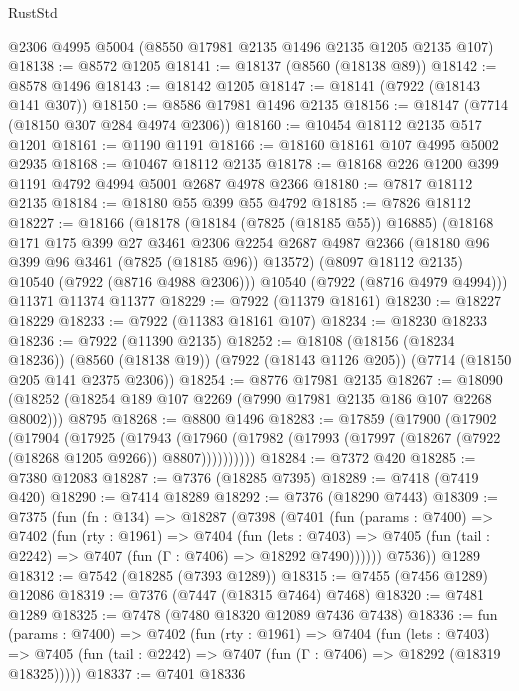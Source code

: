 \begin{lexlean}{RustStd}
\begin{coremodule}
    @2306
    @4995
    @5004
    (@8550 @17981 @2135 @1496 @2135 @1205 @2135 @107)
@18138 := @8572 @1205
@18141 := @18137 (@8560 (@18138 @89))
@18142 := @8578 @1496
@18143 := @18142 @1205
@18147 := @18141 (@7922 (@18143 @141 @307))
@18150 := @8586 @17981 @1496 @2135
@18156 := @18147 (@7714 (@18150 @307 @284 @4974 @2306))
@18160 := @10454 @18112 @2135 @517 @1201
@18161 := @1190 @1191
@18166 := @18160 @18161 @107 @4995 @5002 @2935
@18168 := @10467 @18112 @2135
@18178 := @18168 @226 @1200 @399 @1191 @4792 @4994 @5001 @2687 @4978 @2366
@18180 := @7817 @18112 @2135
@18184 := @18180 @55 @399 @55 @4792
@18185 := @7826 @18112
@18227 := @18166
    (@18178
      (@18184 (@7825 (@18185 @55)) @16885)
      (@18168
        @171
        @175
        @399
        @27
        @3461
        @2306
        @2254
        @2687
        @4987
        @2366
        (@18180 @96 @399 @96 @3461 (@7825 (@18185 @96)) @13572)
        (@8097 @18112 @2135)
        @10540
        (@7922 (@8716 @4988 @2306)))
      @10540
      (@7922 (@8716 @4979 @4994)))
    @11371
    @11374
    @11377
@18229 := @7922 (@11379 @18161)
@18230 := @18227 @18229
@18233 := @7922 (@11383 @18161 @107)
@18234 := @18230 @18233
@18236 := @7922 (@11390 @2135)
@18252 := @18108
    (@18156 (@18234 @18236))
    (@8560 (@18138 @19))
    (@7922 (@18143 @1126 @205))
    (@7714 (@18150 @205 @141 @2375 @2306))
@18254 := @8776 @17981 @2135
@18267 := @18090 (@18252 (@18254 @189 @107 @2269 (@7990 @17981 @2135 @186 @107 @2268 @8002))) @8795
@18268 := @8800 @1496
@18283 := @17859
    (@17900
      (@17902
        (@17904
          (@17925
            (@17943
              (@17960 (@17982 (@17993 (@17997 (@18267 (@7922 (@18268 @1205 @9266)) @8807))))))))))
@18284 := @7372 @420
@18285 := @7380 @12083
@18287 := @7376 (@18285 @7395)
@18289 := @7418 (@7419 @420)
@18290 := @7414 @18289
@18292 := @7376 (@18290 @7443)
@18309 := @7375
    (fun (fn : @134) =>
    @18287
      (@7398
        (@7401
          (fun (params : @7400) =>
          @7402
            (fun (rty : @1961) =>
            @7404
              (fun (lets : @7403) =>
              @7405 (fun (tail : @2242) => @7407 (fun (Γ : @7406) => @18292 @7490))))))
        @7536))
    @1289
@18312 := @7542 (@18285 (@7393 @1289))
@18315 := @7455 (@7456 @1289) @12086
@18319 := @7376 (@7447 (@18315 @7464) @7468)
@18320 := @7481 @1289
@18325 := @7478 (@7480 @18320 @12089 @7436 @7438)
@18336 := fun (params : @7400) =>
  @7402
    (fun (rty : @1961) =>
    @7404
      (fun (lets : @7403) =>
      @7405 (fun (tail : @2242) => @7407 (fun (Γ : @7406) => @18292 (@18319 @18325)))))
@18337 := @7401 @18336

\end{coremodule}
\end{lexlean}
